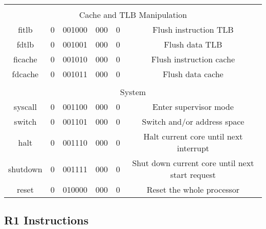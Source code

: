 \documentclass{article}
\begin{document}
\begin{center}
\begin{longtable}{|c|l|r|l|r|l|r|c|c|}
    \hline              \multicolumn{9}{|c|}{} \\
    
                        \multicolumn{9}{|c|}{Cache and TLB Manipulation} \\
    \hline fitlb    &   \multicolumn{2}{|c|}{0}     &   \multicolumn{2}{|c|}{001000}    &   \multicolumn{2}{|c|}{000}   &   0   &   Flush instruction TLB \\
    \hline fdtlb    &   \multicolumn{2}{|c|}{0}     &   \multicolumn{2}{|c|}{001001}    &   \multicolumn{2}{|c|}{000}   &   0   &   Flush data TLB \\
    \hline ficache  &   \multicolumn{2}{|c|}{0}     &   \multicolumn{2}{|c|}{001010}    &   \multicolumn{2}{|c|}{000}   &   0   &   Flush instruction cache \\
    \hline fdcache  &   \multicolumn{2}{|c|}{0}     &   \multicolumn{2}{|c|}{001011}    &   \multicolumn{2}{|c|}{000}   &   0   &   Flush data cache \\
    
    
    \hline              \multicolumn{9}{|c|}{} \\
    
                        \multicolumn{9}{|c|}{System} \\
    \hline syscall  &   \multicolumn{2}{|c|}{0}     &   \multicolumn{2}{|c|}{001100}    &   \multicolumn{2}{|c|}{000}   &   0   &   Enter supervisor mode \\
    \hline switch   &   \multicolumn{2}{|c|}{0}     &   \multicolumn{2}{|c|}{001101}    &   \multicolumn{2}{|c|}{000}   &   0   &   Switch and/or address space \\
    \hline halt     &   \multicolumn{2}{|c|}{0}     &   \multicolumn{2}{|c|}{001110}    &   \multicolumn{2}{|c|}{000}   &   0   &   Halt current core until next interrupt \\
    \hline shutdown &   \multicolumn{2}{|c|}{0}     &   \multicolumn{2}{|c|}{001111}    &   \multicolumn{2}{|c|}{000}   &   0   &   Shut down current core until next start request \\
    \hline reset    &   \multicolumn{2}{|c|}{0}     &   \multicolumn{2}{|c|}{010000}    &   \multicolumn{2}{|c|}{000}   &   0   &   Reset the whole processor \\
    
    
    \hline
    \end{longtable}
    \end{center}
    
    
    \subsection{R1 Instructions}
    
\end{document}
